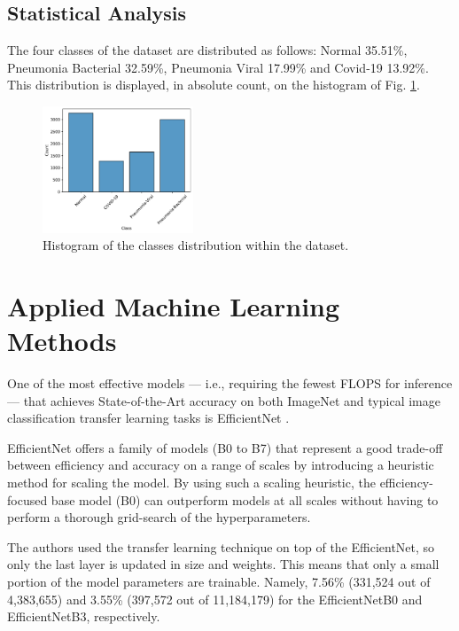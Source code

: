 \documentclass[conference]{IEEEtran}
\begin{document}
\subsection{Statistical Analysis}

The four classes of the dataset are distributed as follows: Normal 35.51\%, Pneumonia Bacterial 32.59\%, Pneumonia Viral 17.99\% and Covid-19 13.92\%. This distribution is displayed, in absolute count, on the histogram of Fig. \ref{fig:data_distribution}.

\begin{figure}[htp]
    \centering
    \includegraphics[width=0.4\textwidth]{imgs/data_distribution.pdf}
    \caption{Histogram of the classes distribution within the dataset.}
    \label{fig:data_distribution}
\end{figure}

\section{Applied Machine Learning Methods}
\label{sec:applied_models}

One of the most effective models — i.e., requiring the fewest FLOPS for inference — that achieves State-of-the-Art accuracy on both ImageNet \cite{deng2009imagenet} and typical image classification transfer learning tasks is EfficientNet \cite{tan2019efficientnet}.

EfficientNet offers a family of models (B0 to B7) that represent a good trade-off between efficiency and accuracy on a range of scales by introducing a heuristic method for scaling the model. By using such a scaling heuristic, the efficiency-focused base model (B0) can outperform models at all scales without having to perform a thorough grid-search of the hyperparameters.

The authors used the transfer learning technique on top of the EfficientNet, so only the last layer is updated in size and weights. This means that only a small portion of the model parameters are trainable. Namely, 7.56\% (331,524 out of 4,383,655) and 3.55\% (397,572 out of 11,184,179) for the EfficientNetB0 and EfficientNetB3, respectively.
\end{document}
